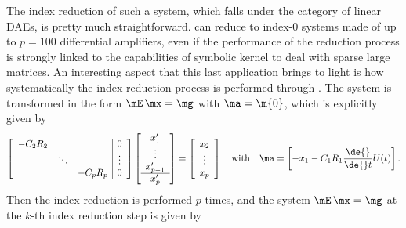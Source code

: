 The index reduction of such a system, which falls under the category of linear \acp{DAE}, is pretty much straightforward. \Indigo{} can reduce to index-0 systems made of up to $p = 100$ differential amplifiers, even if the performance of the reduction process is strongly linked to the capabilities of \Maple{} symbolic kernel to deal with sparse large matrices. An interesting aspect that this last application brings to light is how systematically the index reduction process is performed through \Indigo{}. The system is transformed in the form $\mE \, \mx = \mg$ with $\ma = \m{0}$, which is explicitly given by
%
\begin{equation}
  \left[\begin{array}{ccc|c}
    -C_2 R_2 & & & 0 \\
    & \ddots & & \vdots \\
    & & -C_p R_p & 0 \\
  \end{array}\right]
  \left[\begin{array}{c}
    x_1^{\prime} \\ \vdots \\ x_{p-1}^{\prime} \\ \hline x_p^{\prime}
  \end{array}\right] = \left[\begin{array}{c}
    x_2 \\ \vdots \\ x_p
  \end{array}\right]
  \quad \text{with} \quad
  \ma = \begin{bmatrix}
    - x_1 - C_1 R_1 \dfrac{\de{}}{\de{}t}U(t)
  \end{bmatrix} \text{.}
\end{equation}
%
Then the index reduction is performed $p$ times, and the system $\mE \, \mx = \mg$ at the $k$-th index reduction step is given by
%
